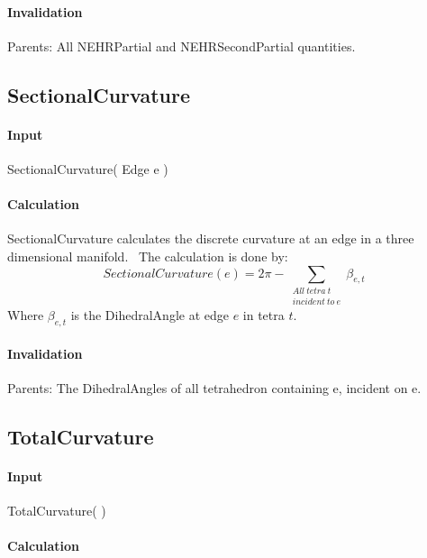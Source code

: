 \paragraph{Invalidation}

Parents: All NEHRPartial and NEHRSecondPartial quantities.

\subsection{SectionalCurvature}

\paragraph{Input}

SectionalCurvature( Edge e )

\paragraph{Calculation}

SectionalCurvature calculates the discrete curvature at an edge in a three
dimensional manifold. \ The calculation is done by: 
\begin{equation*}
SectionalCurvature(e)=2\pi -\sum_{\substack{ All~tetra~t~  \\ incident~to~e}}%
\beta _{e,t}
\end{equation*}%
Where $\beta _{e,t}$ is the DihedralAngle at edge $e$ in tetra $t$.

\paragraph{Invalidation}

\bigskip Parents: The DihedralAngles of all tetrahedron containing e,
incident on e.

\subsection{TotalCurvature}

\paragraph{Input}

TotalCurvature( )

\paragraph{Calculation}

